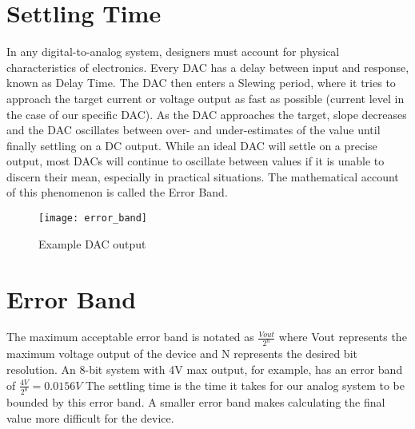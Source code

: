 \section{Settling Time}
In any digital-to-analog system, designers must account for physical characteristics of electronics. Every DAC has a delay between input and response, known as Delay Time. The DAC then enters a Slewing period, where it tries to approach the target current or voltage output as fast as possible (current level in the case of our specific DAC). As the DAC approaches the target, slope decreases and the DAC oscillates between over- and under-estimates of the value until finally settling on a DC output. While an ideal DAC will settle on a precise output, most DACs will continue to oscillate between values if it is unable to discern their mean, especially in practical situations. The mathematical account of this phenomenon is called the Error Band. \par
\begin{figure}[!htb]
	\texttt{[image: error\_band]}
	\centering
	\caption{Example DAC output}
	\centering
\end{figure}
\section{Error Band}
The maximum acceptable error band is notated as
\begin{math}
	\frac{Vout}{2^n}
\end{math}
where Vout represents the maximum voltage output of the device and N represents the desired bit resolution. An 8-bit system with 4V max output, for example, has an error band of 
\begin {math}
	\frac{4V}{2^8}=0.0156V
\end{math}
The settling time is the time it takes for our analog system to be bounded by this error band. A smaller error band makes calculating the final value more difficult for the device.

